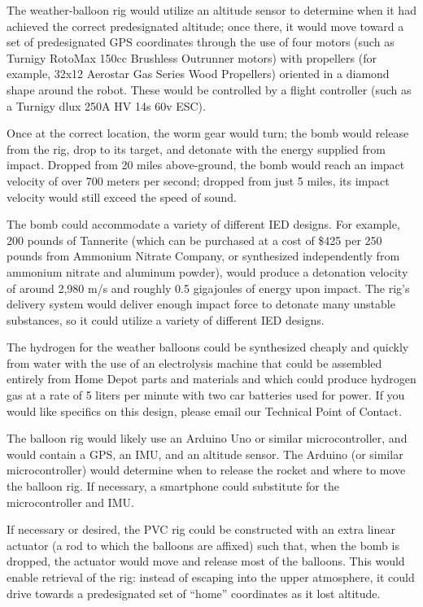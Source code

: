 \documentclass[12pt]{article}
\begin{document}
The weather-balloon rig would utilize an altitude sensor to determine when it had achieved the correct predesignated altitude; once there, it would move toward a set of predesignated GPS coordinates through the use of four motors (such as Turnigy RotoMax 150cc Brushless Outrunner motors) with propellers (for example, 32x12 Aerostar Gas Series Wood Propellers) oriented in a diamond shape around the robot. These would be controlled by a flight controller (such as a Turnigy dlux 250A HV 14s 60v ESC).

Once at the correct location, the worm gear would turn; the bomb would release from the rig, drop to its target, and detonate with the energy supplied from impact. Dropped from 20 miles above-ground, the bomb would reach an impact velocity of over 700 meters per second; dropped from just 5 miles, its impact velocity would still exceed the speed of sound.

The bomb could accommodate a variety of different IED designs. For example, 200 pounds of Tannerite (which can be purchased at a cost of \$425 per 250 pounds from Ammonium Nitrate Company, or synthesized independently from ammonium nitrate and aluminum powder), would produce a detonation velocity of around 2,980 m/s and roughly 0.5 gigajoules of energy upon impact. The rig's delivery system would deliver enough impact force to detonate many unstable substances, so it could utilize a variety of different IED designs.

The hydrogen for the weather balloons could be synthesized cheaply and quickly from water with the use of an electrolysis machine that could be assembled entirely from Home Depot parts and materials and which could produce hydrogen gas at a rate of 5 liters per minute with two car batteries used for power. If you would like specifics on this design, please email our Technical Point of Contact.

The balloon rig would likely use an Arduino Uno or similar microcontroller, and would contain a GPS, an IMU, and an altitude sensor. The  Arduino (or similar microcontroller) would determine when to release the rocket and where to move the balloon rig. If necessary, a smartphone could substitute for the microcontroller and IMU.

If necessary or desired, the PVC rig could be constructed with an extra linear actuator (a rod to which the balloons are affixed) such that, when the bomb is dropped, the actuator would move and release most of the balloons. This would enable retrieval of the rig: instead of escaping into the upper atmosphere, it could drive towards a predesignated set of ``home'' coordinates as it lost altitude.
\end{document}
